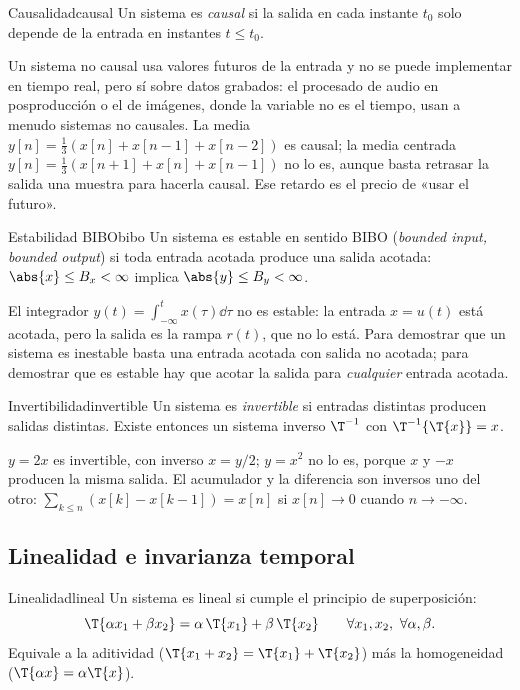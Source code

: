 \documentclass[11pt,a4paper]{scrartcl}
\begin{document}
\begin{definicion}{Causalidad}{causal}
  Un sistema es \emph{causal} si la salida en cada instante $t_0$ solo depende de la entrada en instantes $t\le t_0$.
\end{definicion}

Un sistema no causal usa valores futuros de la entrada y no se puede implementar en tiempo real, pero sí sobre datos grabados: el procesado de audio en posproducción o el de imágenes, donde la variable no es el tiempo, usan a menudo sistemas no causales. La media $y[n]=\frac13(x[n]+x[n-1]+x[n-2])$ es causal; la media centrada $y[n]=\frac13(x[n+1]+x[n]+x[n-1])$ no lo es, aunque basta retrasar la salida una muestra para hacerla causal. Ese retardo es el precio de «usar el futuro».

\begin{definicion}{Estabilidad BIBO}{bibo}
  Un sistema es estable en sentido BIBO (\emph{bounded input, bounded output}) si toda entrada acotada produce una salida acotada: $\abs{x}\le B_x<\infty$ implica $\abs{y}\le B_y<\infty$.
\end{definicion}

El integrador $y(t)=\int_{-\infty}^{t}x(\tau)\dd\tau$ no es estable: la entrada $x=u(t)$ está acotada, pero la salida es la rampa $r(t)$, que no lo está. Para demostrar que un sistema es inestable basta una entrada acotada con salida no acotada; para demostrar que es estable hay que acotar la salida para \emph{cualquier} entrada acotada.

\begin{definicion}{Invertibilidad}{invertible}
  Un sistema es \emph{invertible} si entradas distintas producen salidas distintas. Existe entonces un sistema inverso $\T^{-1}$ con $\T^{-1}\{\T\{x\}\}=x$.
\end{definicion}

$y=2x$ es invertible, con inverso $x=y/2$; $y=x^2$ no lo es, porque $x$ y $-x$ producen la misma salida. El acumulador y la diferencia son inversos uno del otro: $\sum_{k\le n}(x[k]-x[k-1])=x[n]$ si $x[n]\to0$ cuando $n\to-\infty$.

\subsection{Linealidad e invarianza temporal}

\begin{definicion}{Linealidad}{lineal}
  Un sistema es lineal si cumple el principio de superposición:
  \[
    \T\{\alpha x_1+\beta x_2\}=\alpha\,\T\{x_1\}+\beta\,\T\{x_2\}\qquad\forall x_1,x_2,\ \forall\alpha,\beta.
  \]
  Equivale a la aditividad ($\T\{x_1+x_2\}=\T\{x_1\}+\T\{x_2\}$) más la homogeneidad ($\T\{\alpha x\}=\alpha\T\{x\}$).
\end{definicion}
\end{document}
